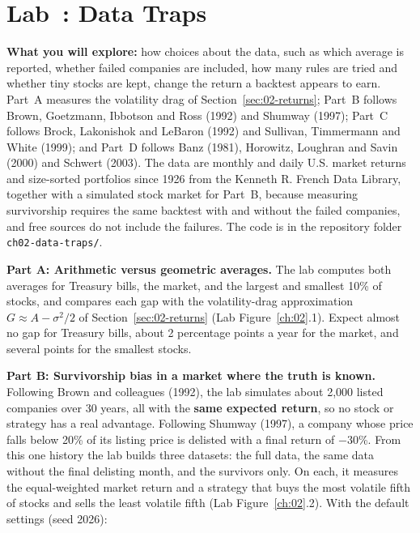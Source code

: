 \section{Lab~\thechapter: Data Traps}
\label{sec:02-lab}

\textbf{What you will explore:} how choices about the data, such as which average is reported, whether failed companies are included, how many rules are tried and whether tiny stocks are kept, change the return a backtest appears to earn. Part~A measures the volatility drag of Section~\ref{sec:02-returns}; Part~B follows Brown, Goetzmann, Ibbotson and Ross (1992) and Shumway (1997); Part~C follows Brock, Lakonishok and LeBaron (1992) and Sullivan, Timmermann and White (1999); and Part~D follows Banz (1981), Horowitz, Loughran and Savin (2000) and Schwert (2003). The data are monthly and daily U.S. market returns and size-sorted portfolios since 1926 from the Kenneth R. French Data Library, together with a simulated stock market for Part~B, because measuring survivorship requires the same backtest with and without the failed companies, and free sources do not include the failures. The code is in the repository folder \texttt{ch02-data-traps/}.

\textbf{Part A: Arithmetic versus geometric averages.} The lab computes both averages for Treasury bills, the market, and the largest and smallest 10\% of stocks, and compares each gap with the volatility-drag approximation $G \approx A - \sigma^2/2$ of Section~\ref{sec:02-returns} (Lab Figure~\ref{ch:02}.1). Expect almost no gap for Treasury bills, about 2 percentage points a year for the market, and several points for the smallest stocks.

\textbf{Part B: Survivorship bias in a market where the truth is known.} Following Brown and colleagues (1992), the lab simulates about 2,000 listed companies over 30 years, all with the \textbf{same expected return}, so no stock or strategy has a real advantage. Following Shumway (1997), a company whose price falls below 20\% of its listing price is delisted with a final return of $-30$\%. From this one history the lab builds three datasets: the full data, the same data without the final delisting month, and the survivors only. On each, it measures the equal-weighted market return and a strategy that buys the most volatile fifth of stocks and sells the least volatile fifth (Lab Figure~\ref{ch:02}.2). With the default settings (seed 2026):


